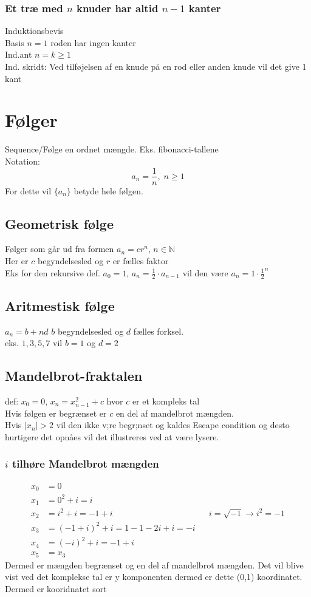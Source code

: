 \documentclass[12pt, a4paper]{article}
\begin{document}
		\subsubsection{Et træ med $n$ knuder har altid $n-1$ kanter}
			Induktionsbevis\\
			Basis $n=1$ roden har ingen kanter\\
			Ind.ant $n=k\geq 1$\\
			Ind. skridt: Ved tilføjelsen af en knude på en rod eller anden knude vil det give 1 kant
\section{Følger}
	Sequence/Følge en ordnet mængde. Eks. fibonacci-tallene\\
	Notation:
		$$a_n=\frac{1}{n},\; n\geq 1$$
	For dette vil $\{a_n\}$ betyde hele følgen.\\
	\subsection{Geometrisk følge}
		Følger som går ud fra formen $a_n=cr^n$, $n\in \mathbb{N}$\\
		Her er $c$ begyndelsesled og $r$ er fælles faktor\\
		Eks for den rekursive def. $a_0=1$, $a_n=\frac{1}{2}\cdot a_{n-1}$ vil den være $a_n=1\cdot \frac{1}{2}^n$
	\subsection{Aritmestisk følge}
		$a_n=b+nd$ $b$ begyndelsesled og $d$ fælles forksel.\\
		eks. $1,3,5,7$ vil $b=1$ og $d=2$
	\subsection{Mandelbrot-fraktalen}
	def: $x_0=0$, $x_n=x^2_{n-1}+c$ hvor $c$ er et kompleks tal\\
	Hvis følgen er begrænset er $c$ en del af mandelbrot mængden.\\
	Hvis $|x_n|>2$ vil den ikke v;re begr;nset og kaldes Escape condition og desto hurtigere det opnåes vil det illustreres ved at være lysere.
	\subsubsection{$i$ tilhøre Mandelbrot mængden}
		\begin{align*}
			x_0&=0\\
			x_1&=0^2+i=i\\
			x_2&=i^2+i=-1+i &&i=\sqrt{-1}\rightarrow i^2=-1\\
			x_3&=(-1+i)^2+i=1-1-2i+i=-i\\
			x_4&=(-i)^2+i=-1+i\\
			x_5&=x_3
		\end{align*}
		Dermed er mængden begrænset og en del af mandelbrot mængden. Det vil blive vist ved det komplekse tal er y komponenten dermed er dette (0,1) koordinatet. Dermed er kooridnatet sort
\end{document}
